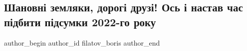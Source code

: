  
 
 
 
 
 
\subsection{Шановні земляки, дорогі друзі! Ось і настав час підбити підсумки 2022-го року}
\label{sec:31_12_2022.fb.filatov_boris.1.pidsumky}
 
\ifcmt
 author_begin
   author_id filatov_boris
 author_end
\fi

